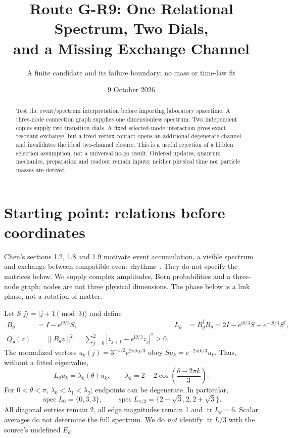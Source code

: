 \documentclass[11pt,a4paper]{article}
\title{Route G-R9: One Relational Spectrum, Two Dials,\\and a Missing Exchange Channel}
\author{A finite candidate and its failure boundary; no mass or time-law fit}
\date{9 October 2026}
\newcommand{\ii}{\mathrm i}
\newcommand{\tr}{\operatorname{tr}}
\newcommand{\ket}[1]{|#1\rangle}
\begin{document}
\maketitle
\begin{abstract}
Test the event/spectrum interpretation before importing laboratory
spacetime. A three-node connection graph supplies one dimensionless
spectrum. Two independent copies supply two transition dials. A fixed
selected-mode interaction gives exact resonant exchange, but a fixed
vertex contact opens an additional degenerate channel and invalidates
the ideal two-channel closure. This is a useful rejection of a hidden
selection assumption, not a universal no-go result. Ordered updates,
quantum mechanics, preparation and readout remain inputs: neither
physical time nor particle masses are derived.
\end{abstract}

\section{Starting point: relations before coordinates}
Chen's sections 1.2, 1.8 and 1.9 motivate event accumulation, a visible
spectrum and exchange between compatible event rhythms~\cite{chen}.
They do not specify the matrices below. We supply complex amplitudes,
Born probabilities and a three-node graph; nodes are not three physical
dimensions. The phase below is a link phase, not a rotation of matter.

Let $S\ket j=\ket{j+1\pmod3}$ and define
\begin{align}
 B_\theta&=I-e^{\ii\theta/3}S,&
 L_\theta&=B_\theta^\dagger B_\theta
 =2I-e^{\ii\theta/3}S-e^{-\ii\theta/3}S^\dagger,\label{L}\\
 Q_\theta(z)&=\|B_\theta z\|^2
 =\sum_{j=0}^2|z_{j+1}-e^{\ii\theta/3}z_j|^2\geq0.
\end{align}
The normalized vectors $u_k(j)=3^{-1/2}e^{2\pi\ii kj/3}$ obey
$Su_k=e^{-2\pi\ii k/3}u_k$. Thus, without a fitted eigenvalue,
\begin{equation}
 L_\theta u_k=\lambda_k(\theta)u_k,\qquad
 \lambda_k=2-2\cos\left(\frac{\theta-2\pi k}{3}\right).\label{spec}
\end{equation}
For $0<\theta<\pi$, $\lambda_0<\lambda_1<\lambda_2$; endpoints can
be degenerate. In particular,
\begin{equation}
 \operatorname{spec}L_0=\{0,3,3\},\qquad
 \operatorname{spec}L_{\pi/2}=\{2-\sqrt3,2,2+\sqrt3\}.
\end{equation}
All diagonal entries remain 2, all edge magnitudes remain 1 and
$\tr L_\theta=6$. Scalar averages do not determine the full spectrum.
We do \emph{not} identify $\tr L/3$ with the source's undefined $E_d$.
\end{document}
